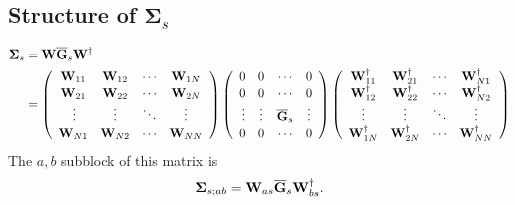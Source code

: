 \documentclass[letterpaper]{article}
\newcommand{\vbSigma}{\boldsymbol{\Sigma}}
\begin{document}
\subsection*{Structure of $\vbSigma_s$}

{\scriptsize
\begin{align*}
 \vbSigma_s &= \vb W \overline{\vb G}_s \vb W^\dagger
\\
&=\left(\begin{array}{cccc}
  \vphantom{\vb W^\dagger_11} 
  \vb W_{11} & \vb W_{12} & \cdots & \vb W_{1N} 
\\ 
  \vphantom{\vb W^\dagger_11} 
  \vb W_{21} & \vb W_{22} & \cdots & \vb W_{2N} 
\\ 
  \vphantom{\vb W^\dagger_11} 
  \vdots     & \vdots     & \ddots & \vdots     
\\
  \vphantom{\vb W^\dagger_11} 
  \vb W_{N1} & \vb W_{N2} & \cdots & \vb W_{NN}
  \end{array}\right)
 \left(\begin{array}{cccc}
  \vphantom{\vb W^\dagger_11} 
  0          & 0          & \cdots &         0          
  \\ 
  \vphantom{\vb W^\dagger_11} 
  0          & 0          & \cdots &         0          
  \\ 
  \vphantom{\vb W^\dagger_11} 
  \vdots     & \vdots     & \overline{\vb G}_{s} &  \vdots     
  \\
  \vphantom{\vb W^\dagger_11} 
  0          & 0          & \cdots &         0
  \end{array}\right)
  \left(\begin{array}{cccc}
  \vb W_{11}^\dagger & \vb W_{21}^\dagger & \cdots & \vb W_{N1}^\dagger \\ 
  \vb W_{12}^\dagger & \vb W_{22}^\dagger & \cdots & \vb W_{N2}^\dagger \\ 
  \vdots     & \vdots     & \ddots & \vdots     \\
  \vb W_{1N}^\dagger & \vb W_{2N}^\dagger & \cdots & \vb W_{NN}^\dagger
  \end{array}\right)
\end{align*}
}
The $a,b$ subblock of this matrix is
$$ \vbSigma_{s; ab} = \vb W_{as} \overline{\vb G}_s \vb W_{bs}^\dagger. $$
\end{document}
